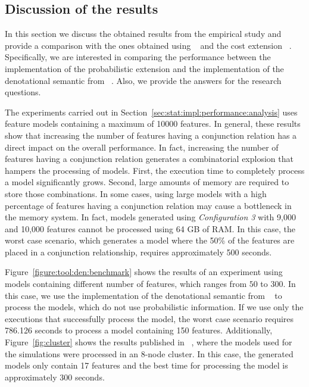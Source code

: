 
\subsection{Discussion of the results}
\label{sec:stat:impl:comp}

In this section we discuss the obtained results from the empirical study and
provide a comparison with the ones obtained using \fodaPA~\cite{acl13}
and the cost extension \fodaPAc~\cite{clc16}. Specifically, we are interested in
comparing the performance between the implementation of the probabilistic
extension and the implementation of the denotational semantic from
\fodaPA~\cite{acl13}.
Also, we provide the answers for the research questions.

The experiments carried out in Section~\ref{sec:stat:impl:performance:analysis}
uses feature models containing a maximum of 10000 features. In general,
these results show that increasing the number of features having a conjunction relation
has a direct impact on the overall performance. In fact, increasing the number of features having
a conjunction relation generates a combinatorial explosion that hampers the processing of models.
First, the execution time to completely process a model significantly grows. Second, large amounts
of memory are required to store those combinations. In some cases, using large models with a high
percentage of features having a conjunction relation may cause a bottleneck in the memory system.
In fact, models generated using \textit{Configuration 3} with 9,000 and 10,000 features cannot be
processed using 64 GB of RAM. In this case,
the worst case scenario, which generates a model where the 50\% of the features are
placed in a conjunction relationship, requires approximately 500 seconds.

Figure~\ref{figure:tool:den:benchmark} shows the results of an experiment using
models containing different number of features, which ranges from $50$ to $300$.
In this case, we use the implementation of the denotational semantic from
\fodaPA~\cite{acl13} to process the models, which do not use probabilistic
information. If we use only the executions that successfully process the model,
the worst case scenario requires 786.126 seconds to process a model containing 150
features. Additionally, Figure~\ref{fig:cluster} shows the results published in
\fodaPAc~\cite{clc16}, where the models used for the simulations were processed in
an 8-node cluster. In this case, the generated models only contain 17 features and
the best time for processing the model is approximately 300 seconds.

